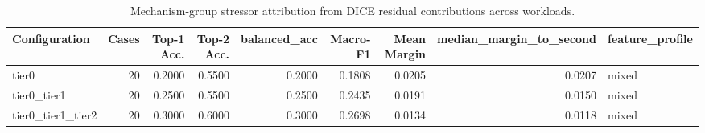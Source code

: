 \begin{table}[t]
\centering
\caption{Mechanism-group stressor attribution from DICE residual contributions across workloads.}
\label{tab:dice_stressor_diagnosis}
\footnotesize
\begin{tabular}{lrrrrrrrl}
\toprule
Configuration & Cases & Top-1 Acc. & Top-2 Acc. & balanced_acc & Macro-F1 & Mean Margin & median_margin_to_second & feature_profile \\
\midrule
tier0 & 20 & 0.2000 & 0.5500 & 0.2000 & 0.1808 & 0.0205 & 0.0207 & mixed \\
tier0_tier1 & 20 & 0.2500 & 0.5500 & 0.2500 & 0.2435 & 0.0191 & 0.0150 & mixed \\
tier0_tier1_tier2 & 20 & 0.3000 & 0.6000 & 0.3000 & 0.2698 & 0.0134 & 0.0118 & mixed \\
\bottomrule
\end{tabular}

\end{table}
